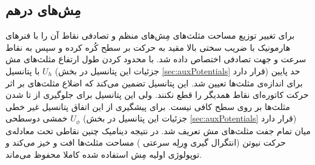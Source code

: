 \subsection{
مِش‌های درهم
}
برای تغییر توزیع مساحت مثلث‌های مِش‌های منظم و تصادفی‌  نقاط آن را با فنر‌های هارمونیک با ضریب سختی بالا مقید به حرکت بر سطح کُره کرده و سپس به نقاط سرعت و جهت تصادفی اختصاص داده شد. با محدود کردن طول ارتفاع مثلث‌های مش با پتانسیل 
$U_{h}$
(جزئیات این پتانسیل در بخش 
\ref{sec:auxPotentials}
قرار دارد) حد پایین برای اندازه‌ی مثلث‌ها تعیین شد. این پتانسیل تضمین می‌کند که اضلاع مثلث‌های بر اثر حرکت کاتوره‌ای نقاط همدیگر را قطع نکنند. ولی این پتانسیل برای جلوگیری از تا شدن مثلث‌ها بر روی سطح کافی نیست. برای پیشگیری از این اتفاق پتانسیل غیر خطی خمشی دوسطحی
$U_{\phi}$
(جزئیات این پتانسیل در بخش 
\ref{sec:auxPotentials}
قرار دارد) میان تمام جفت مثلث‌های مش تعریف شد. در نتیجه دینامیک چنین نقاطی تحت معادله‌ی حرکت نیوتن (انتگرال گیری وِرلِه سرعتی
) مساحت‌ مثلث‌ها افت و خیز می‌کند و توپولوژی اولیه مِش استفاده شده کاملا محفوظ می‌ماند.
 




